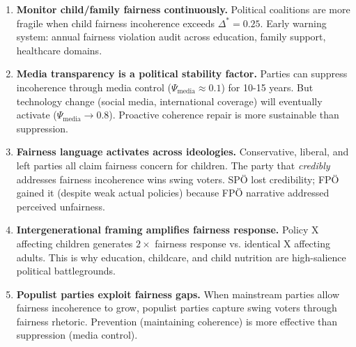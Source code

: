 \begin{tcolorbox}[colback=green!5!white, colframe=green!75!black,
    title=Practical Implications for Political Strategists and Policy Designers]

\begin{enumerate}

\item \textbf{Monitor child/family fairness continuously.} Political coalitions are more fragile
when child fairness incoherence exceeds $\Delta^* = 0.25$. Early warning system: annual fairness
violation audit across education, family support, healthcare domains.

\item \textbf{Media transparency is a political stability factor.} Parties can suppress incoherence
through media control ($\Psi_{\text{media}} \approx 0.1$) for 10-15 years. But technology change
(social media, international coverage) will eventually activate ($\Psi_{\text{media}} \rightarrow 0.8$).
Proactive coherence repair is more sustainable than suppression.

\item \textbf{Fairness language activates across ideologies.} Conservative, liberal, and left parties
all claim fairness concern for children. The party that \textit{credibly} addresses fairness
incoherence wins swing voters. SPÖ lost credibility; FPÖ gained it (despite weak actual policies)
because FPÖ narrative addressed perceived unfairness.

\item \textbf{Intergenerational framing amplifies fairness response.} Policy X affecting children
generates $2\times$ fairness response vs. identical X affecting adults. This is why education,
childcare, and child nutrition are high-salience political battlegrounds.

\item \textbf{Populist parties exploit fairness gaps.} When mainstream parties allow fairness
incoherence to grow, populist parties capture swing voters through fairness rhetoric. Prevention
(maintaining coherence) is more effective than suppression (media control).

\end{enumerate}

\end{tcolorbox}


